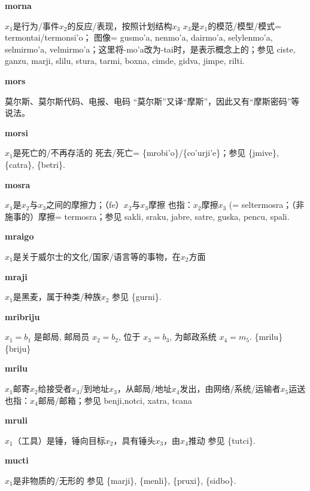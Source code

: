 \documentclass[notitlepage,twocolumn,a4paper,10pt]{book}
\begin{document}
{\sffamily\bfseries morna}\enspace {\ttfamily\bfseries[mon     mo'a]}  $x_1$是行为\slash{}事件$x_2$的反应\slash{}表现，按照计划结构$x_3$ \textemdash{} $x_3$是$x_1$的模范\slash{}模型\slash{}模式= {termontai}\slash{}{termonsi'o}； 图像= {gusmo'a}, {nenmo'a}, {dairmo'a}, {selylenmo'a}, {selmirmo'a}, {velmirmo'a}；这里将-mo'a改为-tai时，是表示概念上的；参见 {ciste}, {ganzu}, {marji}, {slilu}, {stura}, {tarmi}, {boxna}, {cimde}, {gidva}, {jimpe}, {rilti}.

{\sffamily\bfseries mors} 莫尔斯、莫尔斯代码、电报、电码 \textemdash{} “莫尔斯”又译“摩斯”，因此又有“摩斯密码”等说法。

{\sffamily\bfseries morsi}\enspace {\ttfamily\bfseries[    mro]}  $x_1$是死亡的\slash{}不再存活的 \textemdash{} 死去\slash{}死亡= \{mrobi'o\}\slash{}\{co'urji'e\}；参见 \{jmive\}, \{catra\}, \{betri\}.

{\sffamily\bfseries mosra}\enspace {\ttfamily\bfseries[mos]}  $x_1$是$x_2$与$x_3$之间的摩擦力；（fe）$x_2$与$x_3$摩擦 \textemdash{} 也指：$x_2$摩擦$x_3$ (= {seltermosra}；（非施事的）摩擦= {termosra}；参见 {sakli}, {sraku}, {jabre}, {satre}, {guska}, {pencu}, {spali}.

{\sffamily\bfseries mraigo} $x_1$是关于威尔士的文化\slash{}国家\slash{}语言等的事物，在$x_2$方面

{\sffamily\bfseries mraji} $x_1$是黑麦，属于种类\slash{}种族$x_2$ \textemdash{} 参见 \{gurni\}.

{\sffamily\bfseries mribriju} $x_1=b_1$ 是邮局, 邮局员 $x_2=b_2$, 位于 $x_3=b_3$, 为邮政系统 $x_4=m_5$. \textemdash{} \{mrilu\} \{briju\}

{\sffamily\bfseries mrilu}\enspace {\ttfamily\bfseries[    mri]}  $x_1$邮寄$x_2$给接受者$x_3$\slash{}到地址$x_3$，从邮局\slash{}地址$x_4$发出，由网络\slash{}系统\slash{}运输者$x_5$运送 \textemdash{} 也指：$x_4$邮局\slash{}邮箱；参见 {benji},{notci}, {xatra}, {tcana}

{\sffamily\bfseries mruli}\enspace {\ttfamily\bfseries[    mru]}  $x_1$（工具）是锤，锤向目标$x_2$，具有锤头$x_3$，由$x_4$推动 \textemdash{} 参见 \{tutci\}.

{\sffamily\bfseries mucti}\enspace {\ttfamily\bfseries[mut]}  $x_1$是非物质的\slash{}无形的 \textemdash{} 参见 \{marji\}, \{menli\}, \{pruxi\}, \{sidbo\}.
\end{document}
